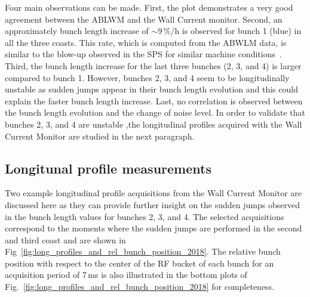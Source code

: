 Four main observations can be made. First, the plot demonstrates a very good agreement between the ABLWM and the Wall Current monitor. Second, an approximately bunch length increase of $\sim$9\,$\%$/h is observed for bunch 1 (blue) in all the three coasts. This rate, which is computed from the ABWLM data, is similar to the blow-up observed in the SPS for similar machine conditions~\cite{Alekou_CC_coast_prep_2016}. Third, the bunch length increase for the last three bunches (2, 3, and 4) is larger compared to bunch 1. However, bunches 2, 3, and 4 seem to be longitudinally unstable as sudden jumps appear in their bunch length evolution and this could explain the faster bunch length increase. Last, no correlation is observed between the bunch length evolution and the change of noise level. In order to validate that bunches 2, 3, and 4 are unstable ,the longitudinal profiles acquired with the Wall Current Monitor are studied in the next paragraph. 

\subsection{Longitunal profile measurements}\label{subsec:long_profiles_meas_2018}
Two example longitudinal profile acquisitions from the Wall Current Monitor are discussed here as they can provide further insight on the sudden jumps observed in the bunch length values for bunches 2, 3, and 4. The selected acquisitions correspond to the moments where the sudden jumps are performed in the second and third coast and are shown in Fig~\ref{fig:long_profiles_and_rel_bunch_position_2018}. The relative bunch position with respect to the center of the RF bucket of each bunch for an acquisition period of 7\,ms is also illustrated in the bottom plots of Fig.~\ref{fig:long_profiles_and_rel_bunch_position_2018} for completeness. 


